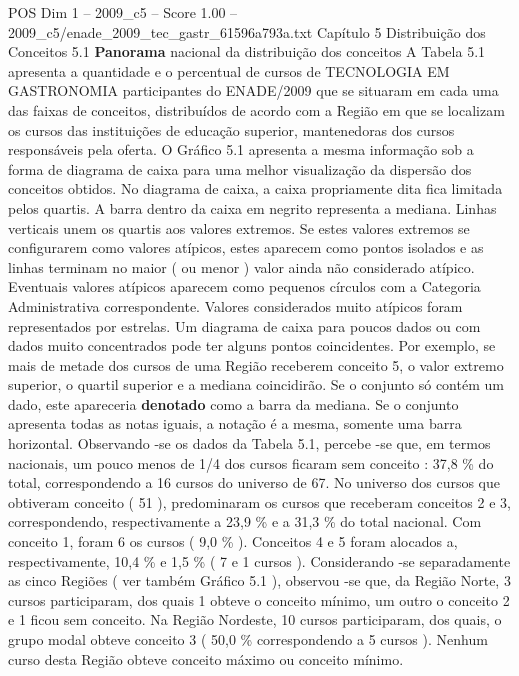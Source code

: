 \begin{textsample}{POS Dim 1 – 2009\_c5 – Score 1.00 – 2009\_c5/enade\_2009\_tec\_gastr\_61596a793a.txt}  \label{ex:f1_pos_149}
Capítulo 5 Distribuição dos Conceitos 5.1 \textbf{Panorama} nacional da distribuição dos conceitos A Tabela 5.1 apresenta a quantidade e o percentual de cursos de TECNOLOGIA EM GASTRONOMIA participantes do ENADE/2009 que se situaram em cada uma das faixas de conceitos, distribuídos de acordo com a Região em que se localizam os cursos das instituições de educação superior, mantenedoras dos cursos responsáveis pela oferta.
O Gráfico 5.1 apresenta a mesma informação sob a forma de diagrama de caixa para uma melhor visualização da dispersão dos conceitos obtidos.
No diagrama de caixa, a caixa propriamente dita fica limitada pelos quartis.
A barra dentro da caixa em negrito representa a mediana.
Linhas verticais unem os quartis aos valores extremos.
Se estes valores extremos se configurarem como valores atípicos, estes aparecem como pontos isolados e as linhas terminam no maior ( ou menor ) valor ainda não considerado atípico.
Eventuais valores atípicos aparecem como pequenos círculos com a Categoria Administrativa correspondente.
Valores considerados muito atípicos foram representados por estrelas.
Um diagrama de caixa para poucos dados ou com dados muito concentrados pode ter alguns pontos coincidentes.
Por exemplo, se mais de metade dos cursos de uma Região receberem conceito 5, o valor extremo superior, o quartil superior e a mediana coincidirão.
Se o conjunto só contém um dado, este apareceria \textbf{denotado} como a barra da mediana.
Se o conjunto apresenta todas as notas iguais, a notação é a mesma, somente uma barra horizontal.
Observando -se os dados da Tabela 5.1, percebe -se que, em termos nacionais, um pouco menos de 1/4 dos cursos ficaram sem conceito : 37,8 \% do total, correspondendo a 16 cursos do universo de 67.
No universo dos cursos que obtiveram conceito ( 51 ), predominaram os cursos que receberam conceitos 2 e 3, correspondendo, respectivamente a 23,9 \% e a 31,3 \% do total nacional.
Com conceito 1, foram 6 os cursos ( 9,0 \% ).
Conceitos 4 e 5 foram alocados a, respectivamente, 10,4 \% e 1,5 \% ( 7 e 1 cursos ).
Considerando -se separadamente as cinco Regiões ( ver também Gráfico 5.1 ), observou -se que, da Região Norte, 3 cursos participaram, dos quais 1 obteve o conceito mínimo, um outro o conceito 2 e 1 ficou sem conceito.
Na Região Nordeste, 10 cursos participaram, dos quais, o grupo modal obteve conceito 3 ( 50,0 \% correspondendo a 5 cursos ).
Nenhum curso desta Região obteve conceito máximo ou conceito mínimo.

\end{textsample}
